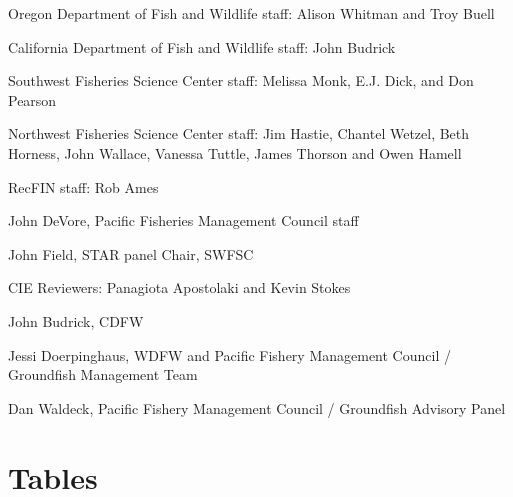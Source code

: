 \documentclass[12pt,]{article}
\begin{document}
Oregon Department of Fish and Wildlife staff: Alison Whitman and Troy
Buell

California Department of Fish and Wildlife staff: John Budrick

Southwest Fisheries Science Center staff: Melissa Monk, E.J. Dick, and
Don Pearson

Northwest Fisheries Science Center staff: Jim Hastie, Chantel Wetzel,
Beth Horness, John Wallace, Vanessa Tuttle, James Thorson and Owen
Hamell

RecFIN staff: Rob Ames

John DeVore, Pacific Fisheries Management Council staff

John Field, STAR panel Chair, SWFSC

CIE Reviewers: Panagiota Apostolaki and Kevin Stokes

John Budrick, CDFW

Jessi Doerpinghaus, WDFW and Pacific Fishery Management Council /
Groundfish Management Team

Dan Waldeck, Pacific Fishery Management Council / Groundfish Advisory
Panel

\newpage

\FloatBarrier

\renewcommand{\thefigure}{\arabic{figure}}
\renewcommand{\thetable}{\arabic{table}}

\setcounter{figure}{0} \setcounter{table}{0} \newpage

\captionsetup[table]{labelformat=simple,format=plain,labelsep=period}

\section{Tables}\label{tables}
\end{document}
